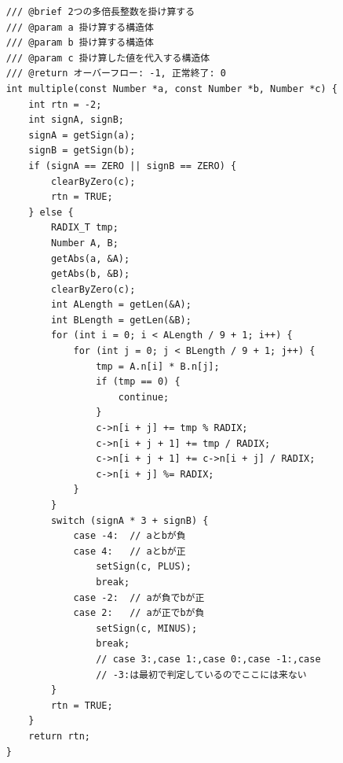 \documentclass[a4paper,11pt,dvipdfmx]{jsarticle}
\begin{document}
\begin{lstlisting}
    /// @brief 2つの多倍長整数を掛け算する
    /// @param a 掛け算する構造体
    /// @param b 掛け算する構造体
    /// @param c 掛け算した値を代入する構造体
    /// @return オーバーフロー: -1, 正常終了: 0
    int multiple(const Number *a, const Number *b, Number *c) {
        int rtn = -2;
        int signA, signB;
        signA = getSign(a);
        signB = getSign(b);
        if (signA == ZERO || signB == ZERO) {
            clearByZero(c);
            rtn = TRUE;
        } else {
            RADIX_T tmp;
            Number A, B;
            getAbs(a, &A);
            getAbs(b, &B);
            clearByZero(c);
            int ALength = getLen(&A);
            int BLength = getLen(&B);
            for (int i = 0; i < ALength / 9 + 1; i++) {
                for (int j = 0; j < BLength / 9 + 1; j++) {
                    tmp = A.n[i] * B.n[j];
                    if (tmp == 0) {
                        continue;
                    }
                    c->n[i + j] += tmp % RADIX;
                    c->n[i + j + 1] += tmp / RADIX;
                    c->n[i + j + 1] += c->n[i + j] / RADIX;
                    c->n[i + j] %= RADIX;
                }
            }
            switch (signA * 3 + signB) {
                case -4:  // aとbが負
                case 4:   // aとbが正
                    setSign(c, PLUS);
                    break;
                case -2:  // aが負でbが正
                case 2:   // aが正でbが負
                    setSign(c, MINUS);
                    break;
                    // case 3:,case 1:,case 0:,case -1:,case
                    // -3:は最初で判定しているのでここには来ない
            }
            rtn = TRUE;
        }
        return rtn;
    }
    

\end{lstlisting}
\end{document}
